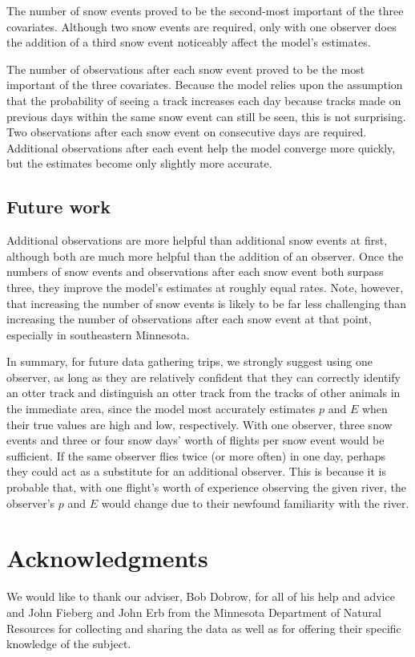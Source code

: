 \documentclass[12pt]{article}
\begin{document}
    The number of snow events proved to be the second-most important of the
    three covariates. Although two snow events are required, only with one
    observer does the addition of a third snow event noticeably affect the
    model's estimates.

    The number of observations after each snow event proved to be the most
    important of the three covariates. Because the model relies upon the
    assumption that the probability of seeing a track increases each day because
    tracks made on previous days within the same snow event can still be seen,
    this is not surprising. Two observations after each snow event on
    consecutive days are required. Additional observations after each event help
    the model converge more quickly, but the estimates become only slightly more
    accurate.

    \subsection{Future work}
    Additional observations are more helpful than additional snow events at
    first, although both are much more helpful than the addition of an observer.
    Once the numbers of snow events and observations after each snow event both
    surpass three, they improve the model's estimates at roughly equal rates.
    Note, however, that increasing the number of snow events is likely to be far
    less challenging than increasing the number of observations after each snow
    event at that point, especially in southeastern Minnesota.

    In summary, for future data gathering trips, we strongly suggest using one
    observer, as long as they are relatively confident that they can correctly
    identify an otter track and distinguish an otter track from the tracks of
    other animals in the immediate area, since the model most accurately
    estimates \(p\) and \(E\) when their true values are high and low,
    respectively. With one observer, three snow events and three or four snow
    days' worth of flights per snow event would be sufficient. If the same
    observer flies twice (or more often) in one day, perhaps they could act as a
    substitute for an additional observer. This is because it is probable that,
    with one flight's worth of experience observing the given river, the
    observer's \(p\) and \(E\) would change due to their newfound familiarity
    with the river.

\section{Acknowledgments}
We would like to thank our adviser, Bob Dobrow, for all of his help and advice 
and John Fieberg and John Erb from the Minnesota Department of Natural Resources
for collecting and sharing the data as well as for offering their specific 
knowledge of the subject.
\end{document}
